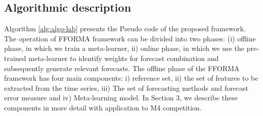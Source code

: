 \documentclass[11pt,a4paper,]{article}
\theoremstyle{definition}
\theoremstyle{definition}
\theoremstyle{definition}
\theoremstyle{remark}
\begin{document}
\subsection{Algorithmic description}\label{algorithmic-description}

Algorithm \ref{alg:algo-lab} presents the Pseudo code of the proposed
framework. The operation of FFORMA framework can be divided into two
phases: (i) offline phase, in which we train a meta-learner, ii) online
phase, in which we use the pre-trained meta-learner to identify weights
for forecast combination and subsequently generate relevant forecasts.
The offline phase of the FFORMA framework has four main components: i)
reference set, ii) the set of features to be extracted from the time
series, iii) The set of forecasting methods and forecast error measure
and iv) Meta-learning model.
In Section 3, we describe these components in more detail with
application to M4 competition.
\end{document}
